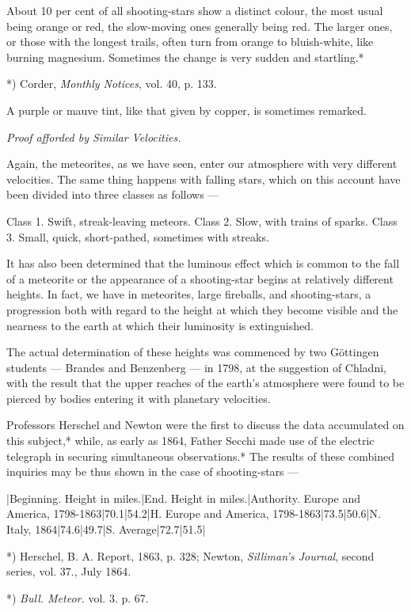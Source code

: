 \documentclass[a4paper, 12pt, oneside, polutonikogreek, english]{article}
\begin{document}
About 10 per cent of all shooting-stars show a distinct colour, the most usual being orange or red, the slow-moving ones generally being red. The larger ones, or those with the longest trails, often turn from orange to bluish-white, like burning magnesium. Sometimes the change is very sudden and startling.*

*) Corder, \emph{Monthly Notices}, vol. 40, p. 133.

A purple or mauve tint, like that given by copper, is sometimes remarked.

\emph{Proof afforded by Similar Velocities.}

Again, the meteorites, as we have seen, enter our atmosphere with very different velocities. The same thing happens with falling stars, which on this account have been divided into three classes as follows ---

Class 1. Swift, streak-leaving meteors. 
Class 2. Slow, with trains of sparks. 
Class 3. Small, quick, short-pathed, sometimes with streaks.

It has also been determined that the luminous effect which is common to the fall of a meteorite or the appearance of a shooting-star begins at relatively different heights. In fact, we have in meteorites, large fireballs, and shooting-stars, a progression both with regard to the height at which they become visible and the nearness to the earth at which their luminosity is extinguished.

The actual determination of these heights was commenced by two Göttingen students --- Brandes and Benzenberg --- in 1798, at the suggestion of Chladni, with the result that the upper reaches of the earth's atmosphere were found to be pierced by bodies entering it with planetary velocities.

Professors Herschel and Newton were the first to discuss the data accumulated on this subject,* while, as early as 1864, Father Secchi made use of the electric telegraph in securing simultaneous observations.* The results of these combined inquiries may be thus shown in the case of shooting-stars ---

|Beginning. Height in miles.|End. Height in miles.|Authority. 
Europe and America, 1798-1863|70.1|54.2|H. 
Europe and America, 1798-1863|73.5|50.6|N. 
Italy, 1864|74.6|49.7|S. 
Average|72.7|51.5|

*) Herschel, B. A. Report, 1863, p. 328; Newton, \emph{Silliman's Journal}, second series, vol. 37., July 1864.

*) \emph{Bull. Meteor.} vol. 3. p. 67.
\end{document}
